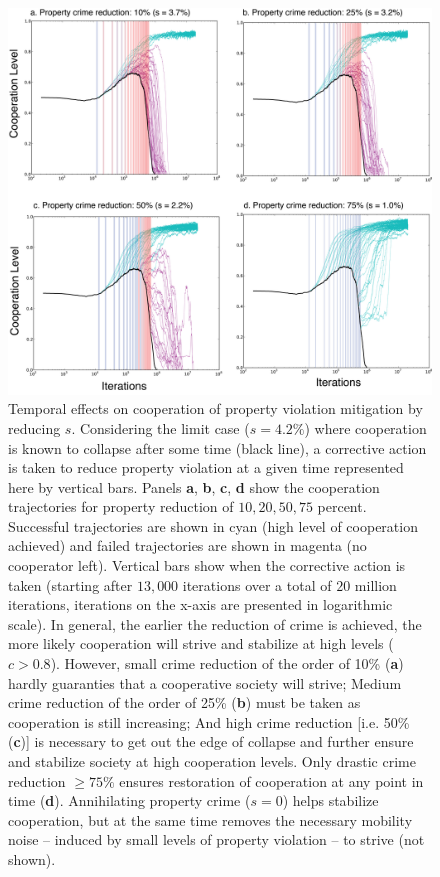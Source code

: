 \begin{figure}[h]
\begin{center}
\centerline{\includegraphics[width=15cm]{../figures2/adaptation.png}}
\caption{Temporal effects on cooperation of property violation mitigation by reducing $s$. Considering the limit case ($s = 4.2\%$) where cooperation is known to collapse after some time (black line), a  corrective action is taken to reduce property violation at a given time represented here by vertical bars. Panels {\bf a}, {\bf b}, {\bf c}, {\bf d} show the cooperation trajectories for property reduction of $10,20,50,75$ percent. Successful trajectories are shown in cyan (high level of cooperation achieved) and failed trajectories are shown in magenta (no cooperator left). Vertical bars show when the corrective action is taken (starting after $13,000$ iterations over a total of $20$ million iterations, iterations on the x-axis are presented in logarithmic scale). In general, the earlier the reduction of crime is achieved, the more likely cooperation will strive and stabilize at high levels ($c > 0.8$). However, small crime reduction of the order of 10\% ({\bf a}) hardly guaranties that a cooperative society will strive; Medium crime reduction of the order of 25\% ({\bf b}) must be taken as cooperation is still increasing; And high crime reduction [i.e. 50\% ({\bf c})] is necessary to get out the edge of collapse and further ensure and stabilize society at high cooperation levels. Only drastic crime reduction $\geqslant 75\%$ ensures restoration of cooperation at any point in time ({\bf d}). Annihilating property crime ($s=0$) helps stabilize cooperation, but at the same time removes the necessary mobility noise -- induced by small levels of property violation -- to strive (not shown).}
\label{fig:adaptation}
\end{center}
\end{figure}




